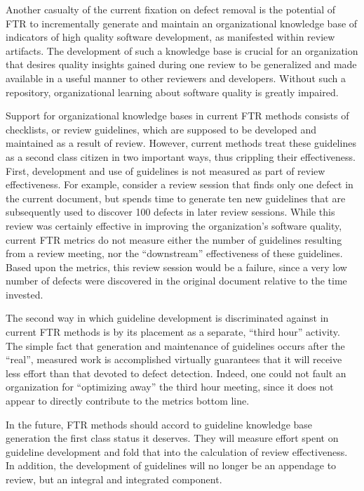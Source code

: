 Another casualty of the current fixation on defect removal is the potential
of FTR to incrementally generate and maintain an organizational knowledge
base of indicators of high quality software development, as manifested
within review artifacts.  The development of such a knowledge base is
crucial for an organization that desires quality insights gained during one
review to be generalized and made available in a useful manner to other
reviewers and developers. Without such a repository, organizational
learning about software quality is greatly impaired. 

Support for organizational knowledge bases in current FTR methods consists
of checklists, or review guidelines, which are supposed to be developed and
maintained as a result of review. However, current methods treat these
guidelines as a second class citizen in two important ways, thus crippling
their effectiveness.  First, development and use of guidelines is not
measured as part of review effectiveness.  For example, consider a review
session that finds only one defect in the current document, but spends time
to generate ten new guidelines that are subsequently used to discover 100
defects in later review sessions.  While this review was certainly
effective in improving the organization's software quality, current FTR
metrics do not measure either the number of guidelines resulting from a
review meeting, nor the ``downstream'' effectiveness of these
guidelines. Based upon the metrics, this review session would be a failure,
since a very low number of defects were discovered in the original document
relative to the time invested.

The second way in which guideline development is discriminated against in
current FTR methods is by its placement as a separate, ``third hour''
activity. The simple fact that generation and maintenance of guidelines
occurs after the ``real'', measured work is accomplished virtually
guarantees that it will receive less effort than that devoted to defect
detection. Indeed, one could not fault an organization for ``optimizing
away'' the third hour meeting, since it does not appear to directly
contribute to the metrics bottom line.

In the future, FTR methods should accord to guideline knowledge base
generation the first class status it deserves.  They will measure effort
spent on guideline development and fold that into the calculation of 
review effectiveness. In addition, the development of guidelines will
no longer be an appendage to review, but an integral and integrated 
component.


